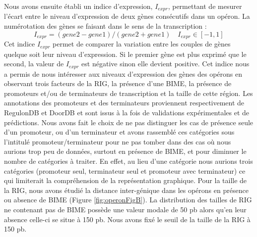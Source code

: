 \documentclass[12pt,a4paper]{report}
\begin{document}
\begin{onehalfspace}
Nous avons ensuite établi un indice d'expression, $I_{expr}$, permettant de mesurer l'écart entre le niveau d'expression de deux gènes consécutifs dans un opéron. La numérotation des gènes se faisant dans le sens de la transcription :
\[ I_{expr} = (gene2 - gene1) / (gene2 + gene1) \quad I_{expr} \in [-1,1]\]
Cet indice $I_{expr}$ permet de comparer la variation entre les couples de gènes quelque soit leur niveau d'expression. Si le premier gène est plus exprimé que le second, la valeur de $I_{expr}$ est négative sinon elle devient positive. Cet indice nous a permis de nous intéresser aux niveaux d'expression des gènes des opérons en observant trois facteurs de la RIG, la présence d'une BIME, la présence de promoteurs et/ou de terminateurs de transcription et la taille de cette région. Les annotations des promoteurs et des terminateurs proviennent respectivement de RegulonDB et DoorDB et sont issus à la fois de validations expérimentales et de prédictions. Nous avons fait le choix de ne pas distinguer les cas de présence seule d'un promoteur, ou d'un terminateur et avons rassemblé ces catégories sous l'intitulé promoteur/terminateur pour ne pas tomber dans des cas où nous aurions trop peu de données, surtout en présence de BIME, et pour diminuer le nombre de catégories à traiter. En effet, au lieu d'une catégorie nous aurions trois catégories (promoteur seul, terminateur seul et promoteur avec terminateur) ce qui limiterait la compréhension de la représentation graphique. Pour la taille de la RIG, nous avons étudié la distance inter-génique dans les opérons en présence ou absence de BIME (Figure \autoref{fig:operonFigB}). La distribution des tailles de RIG ne contenant pas de BIME possède une valeur modale de 50 pb alors qu'en leur absence celle-ci se situe à 150 pb. Nous avons fixé le seuil de la taille de la RIG à 150 pb.


\end{onehalfspace}
\end{document}
